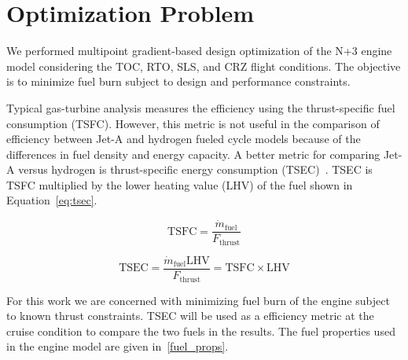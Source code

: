 \documentclass[conf]{new-aiaa}
\begin{document}
\section{Optimization Problem}
\label{sec:optprob}

We performed multipoint gradient-based design optimization of the N+3 engine model considering the TOC, RTO, SLS, and CRZ flight conditions.
The objective is to minimize fuel burn subject to design and performance constraints.

Typical gas-turbine analysis measures the efficiency using the thrust-specific fuel consumption (TSFC).
However, this metric is not useful in the comparison of efficiency between Jet-A and hydrogen fueled cycle models because of the differences in fuel density and energy capacity.
A better metric for comparing Jet-A versus hydrogen is thrust-specific energy consumption (TSEC)~\cite{Adler2023}.
TSEC is TSFC multiplied by the lower heating value (LHV) of the fuel shown in Equation~\eqref{eq:tsec}.

\begin{equation}
    \mathrm{TSFC} = \frac{\dot{m}_{\mathrm{fuel}}}{F_{\mathrm{thrust}}}
    \label{eq:tsfc}
\end{equation}

\begin{equation}
    \mathrm{TSEC} = \frac{\dot{m}_{\mathrm{fuel}} \mathrm{LHV}}{F_{\mathrm{thrust}}} = \mathrm{TSFC} \times \mathrm{LHV}
    \label{eq:tsec}
\end{equation}

For this work we are concerned with minimizing fuel burn of the engine subject to known thrust constraints.
TSEC will be used as a efficiency metric at the cruise condition to compare the two fuels in the results.
The fuel properties used in the engine model are given in~\ref{fuel_props}.
\end{document}
